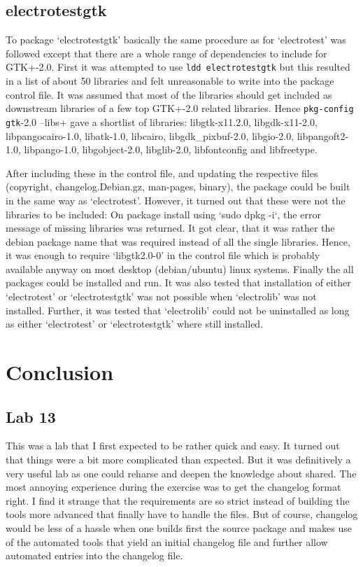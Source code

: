 \documentclass[a4paper,11pt,twoside]{article}
\begin{document}
\subsection{electrotestgtk}
To package `electrotestgtk' basically the same procedure as for `electrotest'
was followed except that there are a whole range of dependencies to include for
GTK+-2.0. First it was attempted to use \verb+ldd electrotestgtk+ but this
resulted in a list of about 50 libraries and felt unreasonable to write into
the package control file. It was assumed that most of the libraries should get
included as downstream libraries of a few top GTK+-2.0 related libraries. Hence
\verb+pkg-config gtk+-2.0 --libs+ gave a shortlist of libraries: libgtk-x11.2.0,
libgdk-x11-2.0, libpangocairo-1.0, libatk-1.0, libcairo, libgdk\_pixbuf-2.0,
libgio-2.0, libpangoft2-1.0, libpango-1.0, libgobject-2.0, libglib-2.0, libfontconfig
and libfreetype.

After including these in the control file, and updating the respective files
(copyright, changelog.Debian.gz, man-pages, binary), the package could be built
in the same way as `electrotest'. However, it turned out that these were not
the libraries to be included: On package install using `sudo dpkg -i`, the error
message of missing libraries was returned. It got clear, that it was rather the
debian package name that was required instead of all the single libraries. Hence,
it was enough to require `libgtk2.0-0' in the control file which is probably
available anyway on most desktop (debian/ubuntu) linux systems.
Finally the all packages could be installed and run. It was also tested that
installation of either `electrotest' or `electrotestgtk' was not possible when
`electrolib' was not installed. Further, it was tested that `electrolib' could not
be uninstalled as long as either `electrotest' or `electrotestgtk' where still
installed.

\section{Conclusion}
\subsection{Lab 13}
This was a lab that I first expected to be rather quick and easy. It turned out
that things were a bit more complicated than expected. But it was definitively
a very useful lab as one could reharse and deepen the knowledge about shared. The
most annoying experience during the exercise was to get the changelog format right.
I find it strange that the requirements are so strict instead of building the tools
more advanced that finally have to handle the files. But of course, changelog
would be less of a hassle when one builds first the source package and makes use
of the automated tools that yield an initial changelog file and further allow
automated entries into the changelog file.
\end{document}
